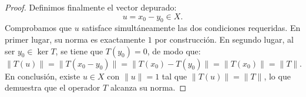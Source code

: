 \documentclass[12pt]{article}
\begin{document}
\begin{ejercicio}
\begin{proof}
            Definimos finalmente el vector depurado:
            \begin{equation*}
                u = x_0 - y_0 \in X .
            \end{equation*}
            Comprobamos que $u$ satisface simultáneamente las dos condiciones requeridas. En primer lugar, su norma es exactamente $1$ por construcción. En segundo lugar, al ser $y_0 \in \ker T$, se tiene que $T(y_0) = 0$, de modo que:
            \begin{equation*}
                \|T(u)\| = \|T(x_0 - y_0)\| = \|T(x_0) - T(y_0)\| = \|T(x_0)\| = \|T\| .
            \end{equation*}
            En conclusión, existe $u \in X$ con $\|u\| = 1$ tal que $\|T(u)\| = \|T\|$, lo que demuestra que el operador $T$ alcanza su norma.
        \end{proof}

    \end{ejercicio}
\end{document}
